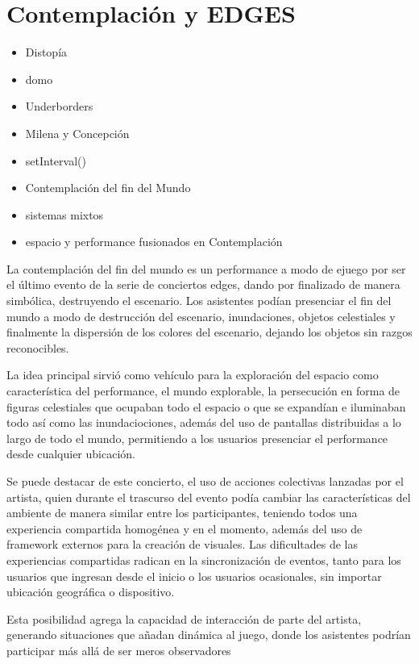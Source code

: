 
\section*{Contemplación y EDGES} %

\begin{itemize}
\item Distopía
\item domo 
\item Underborders
\item Milena y Concepción
\item setInterval()
\item Contemplación del fin del Mundo
\item sistemas mixtos
\item espacio y performance fusionados en Contemplación
\end{itemize}


La contemplación del fin del mundo es un performance a modo de ejuego por ser el último evento de la serie de conciertos edges, dando por finalizado de manera simbólica, destruyendo el escenario.
Los asistentes podían presenciar el fin del mundo a modo de destrucción del escenario, inundaciones, objetos celestiales y finalmente la dispersión de los colores del escenario, dejando los objetos sin razgos reconocibles.

La idea principal sirvió como vehículo para la exploración del espacio como característica del performance, el mundo explorable, la persecución en forma de figuras celestiales que ocupaban todo el espacio o que se expandían e iluminaban todo así como las inundaciociones, además del uso de pantallas distribuidas a lo largo de todo el mundo, permitiendo a los usuarios presenciar el performance desde cualquier ubicación.

Se puede destacar de este concierto, el uso de acciones colectivas lanzadas por el artista, quien durante el trascurso del evento podía cambiar las características del ambiente de manera similar entre los participantes, teniendo todos una experiencia compartida homogénea y en el momento, además del uso de framework externos  para la creación de visuales.
Las dificultades de las experiencias compartidas radican en la sincronización de eventos, tanto para los usuarios que ingresan desde el inicio o los usuarios ocasionales, sin importar ubicación geográfica o dispositivo.

Esta posibilidad agrega la capacidad de interacción de parte del artista, generando situaciones que añadan dinámica al juego, donde los asistentes podrían participar más allá de ser meros observadores
